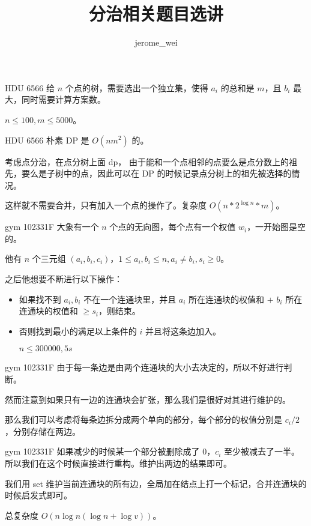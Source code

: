 \documentclass[UTF8,nofonts]{ctexbeamer}
\title{分治相关题目选讲}
\author{jerome\_wei}
\date{}
\institute{cdqz}
\begin{document}
\maketitle

\begin{frame}{HDU 6566}
给 $n$ 个点的树，需要选出一个独立集，使得 $a_i$ 的总和是 $m$，且 $b_i$ 最大，同时需要计算方案数。

$n\le 100,m\le 5000$。
\end{frame}

\begin{frame}{HDU 6566}
朴素 DP 是 $O(nm^2)$ 的。\pause

考虑点分治，在点分树上面 dp， 由于能和一个点相邻的点要么是点分数上的祖先，要么是子树中的点，因此可以在 DP 的时候记录点分树上的祖先被选择的情况。\pause

这样就不需要合并，只有加入一个点的操作了。复杂度 $O(n * 2^{\log n} * m)$。

\end{frame}

\begin{frame}{gym 102331F}
大象有一个 $n$ 个点的无向图，每个点有一个权值 $w_i$，一开始图是空的。

他有 $n$ 个三元组 $(a_i,b_i,c_i)$，$1\le a_i,b_i\le n, a_i\ne b_i, s_i\ge 0$。

之后他想要不断进行以下操作：

\begin{itemize}
\item 如果找不到 $a_i,b_i$ 不在一个连通块里，并且 $a_i$ 所在连通块的权值和 $+$ $b_i$ 所在连通块的权值和 $\ge s_i$，则结束。
\item 否则找到最小的满足以上条件的 $i$ 并且将这条边加入。

$n\le 300000, 5s$
\end{itemize}
\end{frame}

\begin{frame}{gym 102331F}
由于每一条边是由两个连通块的大小去决定的，所以不好进行判断。

然而注意到如果只有一边的连通块会扩张，那么我们是很好对其进行维护的。\pause

那么我们可以考虑将每条边拆分成两个单向的部分，每个部分的权值分别是 $c_i/2$，分别存储在两边。
\end{frame}
\begin{frame}{gym 102331F}
如果减少的时候某一个部分被删除成了 $0$，$c_i$ 至少被减去了一半。所以我们在这个时候直接进行重构。维护出两边的结果即可。\pause

我们用 set 维护当前连通块的所有边，全局加在结点上打一个标记，合并连通块的时候启发式即可。

总复杂度 $O(n\log n(\log n + \log v))$。
\end{frame}
\end{document}
